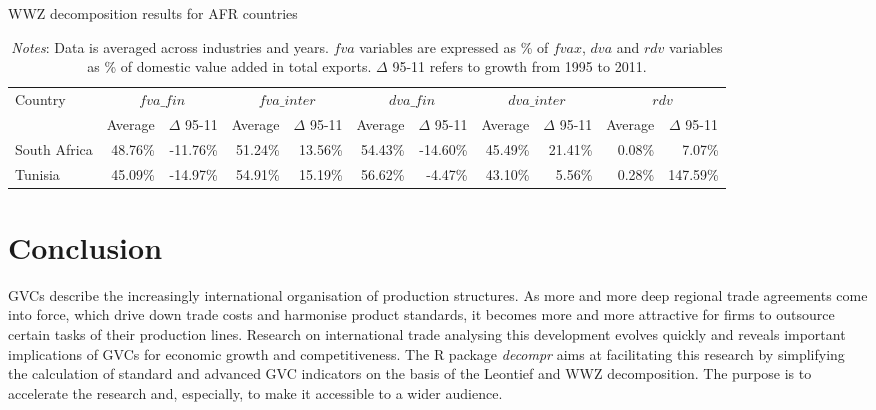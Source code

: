\documentclass[a4paper,11pt]{article}
\begin{document}
\vspace{1cm}

\begin{table}[h!]\small
  \centering
  \caption{WWZ decomposition results for AFR countries}
  \hspace*{-2.7cm}
    \begin{tabular}{lrrrrrrrrrr} 
    \toprule
    \multicolumn{1}{l}{{Country}} & \multicolumn{2}{c}{$fva\_fin$} & \multicolumn{2}{c}{$fva\_inter$} & \multicolumn{2}{c}{$dva\_fin$} & \multicolumn{2}{c}{$dva\_inter$} & \multicolumn{2}{c}{$rdv$} \\
    \multicolumn{1}{l}{} & \multicolumn{1}{c}{Average} & \multicolumn{1}{c}{$\Delta$ 95-11} &
\multicolumn{1}{c}{Average} & \multicolumn{1}{c}{$\Delta$ 95-11} & \multicolumn{1}{c}{Average} & \multicolumn{1}{c}{$\Delta$ 95-11} & \multicolumn{1}{c}{Average} & \multicolumn{1}{c}{$\Delta$ 95-11} & \multicolumn{1}{c}{Average} & \multicolumn{1}{c}{$\Delta$ 95-11} \\
  \midrule
South Africa & 48.76\% & -11.76\% & 51.24\% & 13.56\% & 54.43\% & -14.60\% & 45.49\% & 21.41\% & 0.08\% & 7.07\% \\
    Tunisia & 45.09\% & -14.97\% & 54.91\% & 15.19\% & 56.62\% & -4.47\% & 43.10\% & 5.56\% & 0.28\% & 147.59\% \\
\bottomrule
    \end{tabular}
  \label{tab:afrwwz}
     \caption*{\textit{Notes}: Data is averaged across industries and years. $fva$ variables are expressed as \% of $fvax$, $dva$ and $rdv$ variables as \% of domestic value added in total exports. $\Delta$ 95-11 refers to growth from 1995 to 2011.}
\end{table}

\pagebreak

\section{Conclusion}\label{sec:conclusion}

GVCs describe the increasingly international organisation of production structures.
As more and more deep regional trade agreements come into force, which drive down trade costs and harmonise product standards, it becomes more and more attractive for firms to outsource certain tasks of their production lines. Research on international trade analysing this development evolves quickly and reveals important implications of GVCs for economic growth and competitiveness. The R package \textit{decompr} aims at facilitating this research by simplifying the calculation of standard and advanced GVC indicators on the basis of the Leontief and WWZ decomposition. The purpose is to accelerate the research and, especially, to make it accessible to a wider audience.
\end{document}

